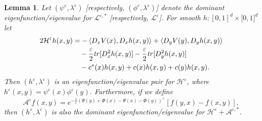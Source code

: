 \documentclass[english,11pt]{article}%
\newtheorem{lemma}[theorem]{Lemma}
\numberwithin{equation}{section}
\numberwithin{example}{section}
\numberwithin{theorem}{section}
\begin{document}
\begin{lemma}
\label{lem:swap} Let $(\psi^{\varepsilon},\lambda^{\varepsilon})$
[respectively, $(\phi^{\varepsilon},\lambda^{\varepsilon})$] denote the
dominant eigenfunction/eigenvalue for $\mathcal{L}^{\varepsilon,\ast}$
[respectively, $\mathcal{L}^{\varepsilon}$]. For smooth $h:[0,1]^{d}%
\times\lbrack0,1]^{d}$ let
\begin{align*}
2\mathcal{H}^{\varepsilon}h(x,y)  &  =-\left\langle D_{x}V(x),D_{x}%
h(x,y)\right\rangle +\left\langle D_{y}V(y),D_{y}h(x,y)\right\rangle \\
&  \quad-\frac{\varepsilon}{2}\text{\emph{tr}}[D_{x}^{2}h(x,y)]-\frac
{\varepsilon}{2}\text{\emph{tr}}[D_{y}^{2}h(x,y)]\\
&  \quad-c^{\ast}(x)h(x,y)+c(x)h(x,y)+c(y)h(x,y).
\end{align*}
Then $(h^{\varepsilon},\lambda^{\varepsilon})$ is an eigenfunction/eigenvalue
pair for $\mathcal{H}^{\varepsilon}$, where $h^{\varepsilon}(x,y)=\psi
^{\varepsilon}(x)\phi^{\varepsilon}(y)$. Furthermore, if we define
\[
\mathcal{A}^{\varepsilon}f(x,y)=e^{-\frac{1}{\varepsilon}\left(  \Psi
(y)+\Phi(x)-\Psi(x)-\Phi(y)\right)  ^{+}}\left[  f(y,x)-f(x,y)\right]  ,
\]
then $(h^{\varepsilon},\lambda^{\varepsilon})$ is also the dominant
eigenfunction/eigenvalue for $\mathcal{H}^{\varepsilon}+\mathcal{A}%
^{\varepsilon,\ast}$.
\end{lemma}
\end{document}

